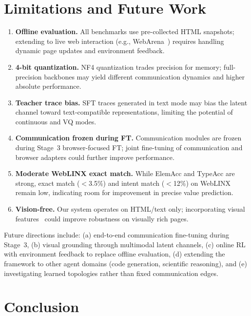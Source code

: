 \documentclass{article}
\begin{document}
\section{Limitations and Future Work}
\label{sec:limitations}

\begin{enumerate}[leftmargin=*,itemsep=1pt]
\item \textbf{Offline evaluation.}  All benchmarks use pre-collected HTML snapshots; extending to live web interaction (e.g., WebArena~\cite{zhou2024webarena}) requires handling dynamic page updates and environment feedback.
\item \textbf{4-bit quantization.}  NF4 quantization trades precision for memory; full-precision backbones may yield different communication dynamics and higher absolute performance.
\item \textbf{Teacher trace bias.}  SFT traces generated in text mode may bias the latent channel toward text-compatible representations, limiting the potential of continuous and VQ modes.
\item \textbf{Communication frozen during FT.}  Communication modules are frozen during Stage~3 browser-focused FT; joint fine-tuning of communication and browser adapters could further improve performance.
\item \textbf{Moderate WebLINX exact match.}  While ElemAcc and TypeAcc are strong, exact match ($<$3.5\%) and intent match ($<$12\%) on WebLINX remain low, indicating room for improvement in precise value prediction.
\item \textbf{Vision-free.}  Our system operates on HTML/text only; incorporating visual features~\cite{zheng2024seeact,hong2024cogagent} could improve robustness on visually rich pages.
\end{enumerate}

\noindent Future directions include: (a) end-to-end communication fine-tuning during Stage~3, (b) visual grounding through multimodal latent channels, (c) online RL with environment feedback to replace offline evaluation, (d) extending the framework to other agent domains (code generation, scientific reasoning), and (e) investigating learned topologies rather than fixed communication edges.

\section{Conclusion}
\label{sec:conclusion}
\end{document}

